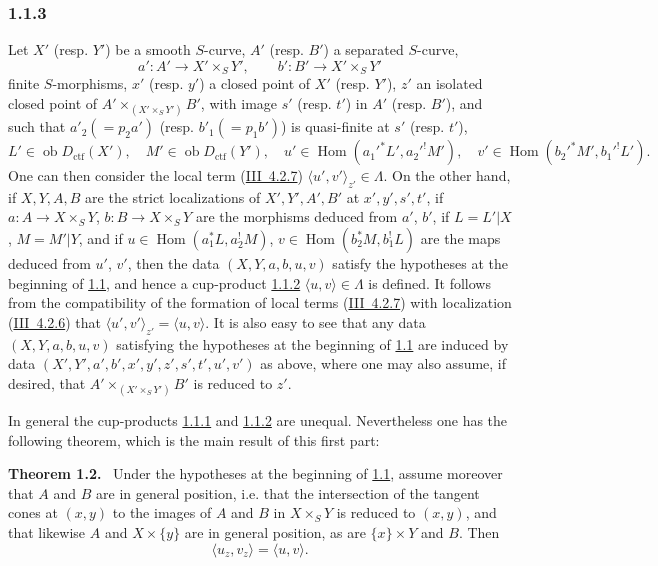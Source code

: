 \documentclass[11pt]{article}
\newenvironment{statement}[1]{\par\medskip\noindent\textbf{#1.}\ }{\par\medskip}
\DeclareMathOperator{\Hom}{Hom}
\newcommand{\ob}{\operatorname{ob}}
\providecommand{\ctf}{\mathrm{ctf}}
\providecommand{\Hom}{\operatorname{Hom}}
\providecommand{\ob}{\operatorname{ob}}
\providecommand{\Hom}{\operatorname{Hom}}
\begin{document}
\subsubsection*{1.1.3}\label{sga5:IIIB:subsubsection:1.1.3}
Let $X'$ (resp. $Y'$) be a smooth $S$-curve, $A'$ (resp. $B'$) a separated $S$-curve,
\[
a':A'\longrightarrow X'\times_S Y',
\qquad
b':B'\longrightarrow X'\times_S Y'
\]
finite $S$-morphisms, $x'$ (resp. $y'$) a closed point of $X'$ (resp. $Y'$), $z'$ an isolated closed point of $A'\times_{(X'\times_S Y')}B'$, with image $s'$ (resp. $t'$) in $A'$ (resp. $B'$), and such that $a'_2(=p_2a')$ (resp. $b'_1(=p_1b')$) is quasi-finite at $s'$ (resp. $t'$),
\[
L'\in\ob D_{\ctf}(X'),\quad M'\in\ob D_{\ctf}(Y'),\quad
u'\in\Hom(a_1'^*L',a_2'^!M'),\quad v'\in\Hom(b_2'^*M',b_1'^!L').
\]
One can then consider the local term (\hyperref[sga5:III:equation:4.2.7]{III~4.2.7}) $\langle u',v'\rangle_{z'}\in\Lambda$. On the other hand, if $X,Y,A,B$ are the strict localizations of $X',Y',A',B'$ at $x',y',s',t'$, if $a:A\to X\times_S Y$, $b:B\to X\times_SY$ are the morphisms deduced from $a'$, $b'$, if $L=L'|X$, $M=M'|Y$, and if $u\in\Hom(a_1^*L,a_2^!M)$, $v\in\Hom(b_2^*M,b_1^!L)$ are the maps deduced from $u'$, $v'$, then the data $(X,Y,a,b,u,v)$ satisfy the hypotheses at the beginning of \hyperref[sga5:IIIB:subsubsection:1.1]{1.1}, and hence a cup-product \hyperref[sga5:IIIB:equation:1.1.2]{1.1.2} $\langle u,v\rangle\in\Lambda$ is defined. It follows from the compatibility of the formation of local terms (\hyperref[sga5:III:equation:4.2.7]{III~4.2.7}) with localization (\hyperref[sga5:III:equation:4.2.6]{III~4.2.6}) that $\langle u',v'\rangle_{z'}=\langle u,v\rangle$. It is also easy to see that any data $(X,Y,a,b,u,v)$ satisfying the hypotheses at the beginning of \hyperref[sga5:IIIB:subsubsection:1.1]{1.1} are induced by data $(X',Y',a',b',x',y',z',s',t',u',v')$ as above, where one may also assume, if desired, that $A'\times_{(X'\times_S Y')}B'$ is reduced to $z'$.

In general the cup-products \hyperref[sga5:IIIB:equation:1.1.1]{1.1.1} and \hyperref[sga5:IIIB:equation:1.1.2]{1.1.2} are unequal. Nevertheless one has the following theorem, which is the main result of this first part:

\label{sga5:IIIB:theorem:1.2}\begin{statement}{Theorem 1.2}
Under the hypotheses at the beginning of \hyperref[sga5:IIIB:subsubsection:1.1]{1.1}, assume moreover that $A$ and $B$ are in general position, i.e. that the intersection of the tangent cones at $(x,y)$ to the images of $A$ and $B$ in $X\times_S Y$ is reduced to $(x,y)$, and that likewise $A$ and $X\times\{y\}$ are in general position, as are $\{x\}\times Y$ and $B$. Then
\begin{equation}\tag{1.2.1}\label{sga5:IIIB:equation:1.2.1}
\langle u_z,v_z\rangle=\langle u,v\rangle.
\end{equation}
\end{statement}
\end{document}
